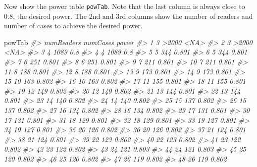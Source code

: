\documentclass[]{book}
\newenvironment{Shaded}{\begin{snugshade}}{\end{snugshade}}
\newcommand{\CommentTok}[1]{\textcolor[rgb]{0.56,0.35,0.01}{\textit{#1}}}
\newcommand{\NormalTok}[1]{#1}
\begin{document}
Now show the power table \texttt{powTab}. Note that the last column is always close to 0.8, the desired power. The 2nd and 3rd columns show the number of readers and number of cases to achieve the desired power.

\begin{Shaded}
\begin{Highlighting}[]
\NormalTok{powTab}
\CommentTok{#>     numReaders numCases power}
\CommentTok{#> 1            3    >2000  <NA>}
\CommentTok{#> 2            3    >2000  <NA>}
\CommentTok{#> 3            4     1089   0.8}
\CommentTok{#> 4            4     1089   0.8}
\CommentTok{#> 5            5      344 0.801}
\CommentTok{#> 6            5      344 0.801}
\CommentTok{#> 7            6      251 0.801}
\CommentTok{#> 8            6      251 0.801}
\CommentTok{#> 9            7      211 0.801}
\CommentTok{#> 10           7      211 0.801}
\CommentTok{#> 11           8      188 0.801}
\CommentTok{#> 12           8      188 0.801}
\CommentTok{#> 13           9      173 0.801}
\CommentTok{#> 14           9      173 0.801}
\CommentTok{#> 15          10      163 0.802}
\CommentTok{#> 16          10      163 0.802}
\CommentTok{#> 17          11      155 0.801}
\CommentTok{#> 18          11      155 0.801}
\CommentTok{#> 19          12      149 0.802}
\CommentTok{#> 20          12      149 0.802}
\CommentTok{#> 21          13      144 0.801}
\CommentTok{#> 22          13      144 0.801}
\CommentTok{#> 23          14      140 0.802}
\CommentTok{#> 24          14      140 0.802}
\CommentTok{#> 25          15      137 0.802}
\CommentTok{#> 26          15      137 0.802}
\CommentTok{#> 27          16      134 0.802}
\CommentTok{#> 28          16      134 0.802}
\CommentTok{#> 29          17      131 0.801}
\CommentTok{#> 30          17      131 0.801}
\CommentTok{#> 31          18      129 0.801}
\CommentTok{#> 32          18      129 0.801}
\CommentTok{#> 33          19      127 0.801}
\CommentTok{#> 34          19      127 0.801}
\CommentTok{#> 35          20      126 0.802}
\CommentTok{#> 36          20      126 0.802}
\CommentTok{#> 37          21      124 0.801}
\CommentTok{#> 38          21      124 0.801}
\CommentTok{#> 39          22      123 0.802}
\CommentTok{#> 40          22      123 0.802}
\CommentTok{#> 41          23      122 0.802}
\CommentTok{#> 42          23      122 0.802}
\CommentTok{#> 43          24      121 0.803}
\CommentTok{#> 44          24      121 0.803}
\CommentTok{#> 45          25      120 0.802}
\CommentTok{#> 46          25      120 0.802}
\CommentTok{#> 47          26      119 0.802}
\CommentTok{#> 48          26      119 0.802}

\end{Highlighting}
\end{Shaded}
\end{document}

